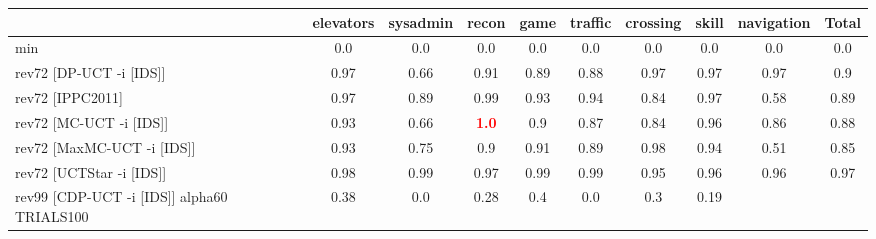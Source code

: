 \documentclass{article}
\begin{document}
\begin{tabular}{|l|r@{$\pm$}rr@{$\pm$}rr@{$\pm$}rr@{$\pm$}rr@{$\pm$}rr@{$\pm$}rr@{$\pm$}rr@{$\pm$}rr@{$\pm$}r|}
\hline

& \multicolumn{2}{c}{elevators}
& \multicolumn{2}{c}{sysadmin}
& \multicolumn{2}{c}{recon}
& \multicolumn{2}{c}{game}
& \multicolumn{2}{c}{traffic}
& \multicolumn{2}{c}{crossing}
& \multicolumn{2}{c}{skill}
& \multicolumn{2}{c}{navigation}
& \multicolumn{2}{c|}{Total}
\\
\hline
\hline
min
& \multicolumn{2}{c}{0.0}
& \multicolumn{2}{c}{0.0}
& \multicolumn{2}{c}{0.0}
& \multicolumn{2}{c}{0.0}
& \multicolumn{2}{c}{0.0}
& \multicolumn{2}{c}{0.0}
& \multicolumn{2}{c}{0.0}
& \multicolumn{2}{c}{0.0}
& \multicolumn{2}{c|}{0.0}
\\
rev72 [DP-UCT -i [IDS]]
& \multicolumn{2}{c}{0.97}
& \multicolumn{2}{c}{0.66}
& \multicolumn{2}{c}{0.91}
& \multicolumn{2}{c}{0.89}
& \multicolumn{2}{c}{0.88}
& \multicolumn{2}{c}{0.97}
& \multicolumn{2}{c}{0.97}
& \multicolumn{2}{c}{0.97}
& \multicolumn{2}{c|}{0.9}
\\
rev72 [IPPC2011]
& \multicolumn{2}{c}{0.97}
& \multicolumn{2}{c}{0.89}
& \multicolumn{2}{c}{0.99}
& \multicolumn{2}{c}{0.93}
& \multicolumn{2}{c}{0.94}
& \multicolumn{2}{c}{0.84}
& \multicolumn{2}{c}{0.97}
& \multicolumn{2}{c}{0.58}
& \multicolumn{2}{c|}{0.89}
\\
rev72 [MC-UCT -i [IDS]]
& \multicolumn{2}{c}{0.93}
& \multicolumn{2}{c}{0.66}
& \multicolumn{2}{c}{\textbf{\textcolor{red}{1.0}}}
& \multicolumn{2}{c}{0.9}
& \multicolumn{2}{c}{0.87}
& \multicolumn{2}{c}{0.84}
& \multicolumn{2}{c}{0.96}
& \multicolumn{2}{c}{0.86}
& \multicolumn{2}{c|}{0.88}
\\
rev72 [MaxMC-UCT -i [IDS]]
& \multicolumn{2}{c}{0.93}
& \multicolumn{2}{c}{0.75}
& \multicolumn{2}{c}{0.9}
& \multicolumn{2}{c}{0.91}
& \multicolumn{2}{c}{0.89}
& \multicolumn{2}{c}{0.98}
& \multicolumn{2}{c}{0.94}
& \multicolumn{2}{c}{0.51}
& \multicolumn{2}{c|}{0.85}
\\
rev72 [UCTStar -i [IDS]]
& \multicolumn{2}{c}{0.98}
& \multicolumn{2}{c}{0.99}
& \multicolumn{2}{c}{0.97}
& \multicolumn{2}{c}{0.99}
& \multicolumn{2}{c}{0.99}
& \multicolumn{2}{c}{0.95}
& \multicolumn{2}{c}{0.96}
& \multicolumn{2}{c}{0.96}
& \multicolumn{2}{c|}{0.97}
\\
\hline
rev99 [CDP-UCT -i [IDS]] alpha60 TRIALS100
& \multicolumn{2}{c}{0.38}
& \multicolumn{2}{c}{0.0}
& \multicolumn{2}{c}{0.28}
& \multicolumn{2}{c}{0.4}
& \multicolumn{2}{c}{0.0}
& \multicolumn{2}{c}{0.3}
& \multicolumn{2}{c}{0.19}

\end{tabular}
\end{document}
